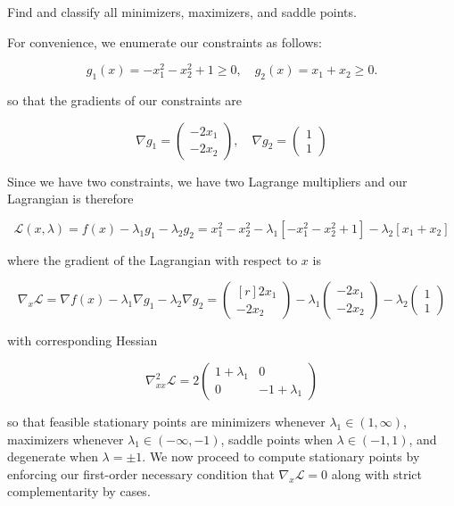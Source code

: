 Find and classify all minimizers, maximizers, and saddle points.

\begin{solution}
    For convenience, we enumerate our constraints as follows:

    $$
    g_1(x) = -x_1^2 - x_2^2 + 1 \ge 0, \quad g_2(x) = x_1 + x_2 \ge 0.
    $$

    so that the gradients of our constraints are

    $$
    \nabla g_1 = \begin{pmatrix*}
        -2 x_1 \\
        -2 x_2
    \end{pmatrix*}, \quad \nabla g_2 = \begin{pmatrix*}
        1 \\
        1
    \end{pmatrix*}
    $$

    Since we have two constraints, we have two Lagrange multipliers and our Lagrangian is therefore

    $$
    \mathcal{L}(x, \lambda) = f(x) - \lambda_1 g_1 - \lambda_2 g_2 
                            = x_1^2 - x_2^2 - \lambda_1 \left[ -x_1^2 - x_2^2 + 1 \right] - \lambda_2 \left[ x_1 + x_2 \right]
    $$

    where the gradient of the Lagrangian with respect to $x$ is 

    $$
    \nabla_x \mathcal{L} = \nabla f(x) - \lambda_1 \nabla g_1 - \lambda_2 \nabla g_2 = \begin{pmatrix*}[r]
        2 x_1 \\
       -2 x_2
    \end{pmatrix*} - \lambda_1 \begin{pmatrix*}
       -2 x_1 \\
       -2 x_2
    \end{pmatrix*} - \lambda_2 \begin{pmatrix*}
        1 \\
        1
    \end{pmatrix*}
    $$

    with corresponding Hessian

    $$
    \nabla^2_{xx} \mathcal{L} = 2 \begin{pmatrix*}
        1 + \lambda_1 & 0 \\
                      0 & -1 + \lambda_1
    \end{pmatrix*}
    $$
    
    so that feasible stationary points are minimizers whenever $\lambda_1 \in (1, \infty)$, maximizers whenever 
    $\lambda_1 \in (-\infty, -1)$, saddle points when $\lambda \in (-1, 1)$, and degenerate when $\lambda = \pm 1$. We 
    now proceed to compute stationary points by enforcing our first-order necessary condition that 
    $\nabla_x \mathcal{L} = 0$ along with strict complementarity by cases.


\end{solution}
